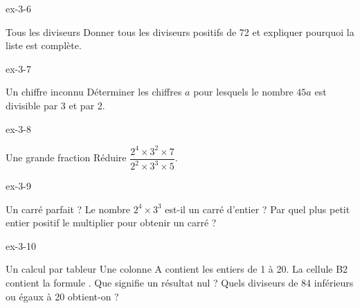 \clearpage{}
\begin{blocLivre}{ex-3-6}\begin{exercice}[2]{Tous les diviseurs}
Donner tous les diviseurs positifs de 72 et expliquer pourquoi la liste est complète.
\end{exercice}\end{blocLivre}
\begin{blocLivre}{ex-3-7}\begin{exercice}[2]{Un chiffre inconnu}
Déterminer les chiffres $a$ pour lesquels le nombre $45a$ est divisible par 3 et par 2.
\end{exercice}\end{blocLivre}
\begin{blocLivre}{ex-3-8}\begin{exercice}[2]{Une grande fraction}
Réduire $\dfrac{2^4\times3^2\times7}{2^2\times3^3\times5}$.
\end{exercice}\end{blocLivre}
\begin{blocLivre}{ex-3-9}\begin{exercice}[2]{Un carré parfait ?}
Le nombre $2^4\times3^3$ est-il un carré d’entier ? Par quel plus petit entier positif le multiplier pour obtenir un carré ?
\end{exercice}\end{blocLivre}
\begin{blocLivre}{ex-3-10}\begin{exercice}[2]{Un calcul par tableur}
Une colonne A contient les entiers de 1 à 20. La cellule B2 contient la formule . Que signifie un résultat nul ? Quels diviseurs de 84 inférieurs ou égaux à 20 obtient-on ?
\end{exercice}\end{blocLivre}

